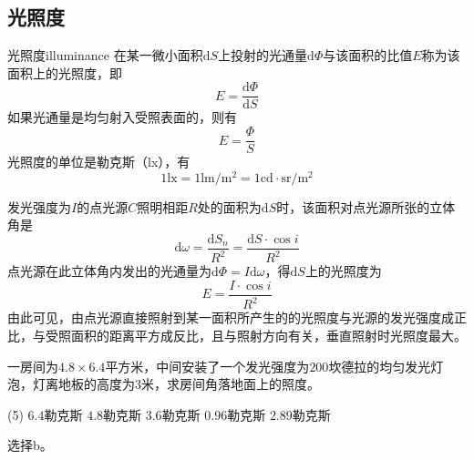 \documentclass[cn,10pt,chinesefont=founder,math=newtx,cite=super,twoside]{elegantbook}
\begin{document}
\subsection{光照度}
\begin{definition}{光照度}{illuminance}
在某一微小面积$\mathrm{d}S$上投射的光通量$\mathrm{d}\varPhi$与该面积的比值$E$称为该面积上的光照度，即
\begin{equation}
E=\frac{\mathrm{d}\varPhi}{\mathrm{d}S}
\end{equation}
如果光通量是均匀射入受照表面的，则有
\begin{equation}
E=\frac{\varPhi}{S}
\end{equation}
光照度的单位是勒克斯（lx），有
\begin{equation}
1\mathrm{lx}=1\mathrm{lm/m^2}=1\mathrm{cd\cdot sr/m^2}
\end{equation}
\end{definition}
\begin{note}
	发光强度为$I$的点光源$C$照明相距$R$处的面积为$\mathrm{d}S$时，该面积对点光源所张的立体角是
	\begin{equation}
	\mathrm{d}\omega=\frac{\mathrm{d}S_n}{R^2}=\frac{\mathrm{d}S\cdot\cos i}{R^2}
	\end{equation}
	点光源在此立体角内发出的光通量为$\mathrm{d}\varPhi=I\mathrm{d}\omega$，得$\mathrm{d}S$上的光照度为
	\begin{equation}
	E=\frac{I\cdot\cos i}{R^2}
	\end{equation}
	由此可见，由点光源直接照射到某一面积所产生的的光照度与光源的发光强度成正比，与受照面积的距离平方成反比，且与照射方向有关，垂直照射时光照度最大。
\end{note}

\begin{problem}
	一房间为$4.8\times6.4$平方米，中间安装了一个发光强度为$200$坎德拉的均匀发光灯泡，灯离地板的高度为$3$米，求房间角落地面上的照度。  
	\begin{tasks}(5)
		\task $6.4$勒克斯
		\task $4.8$勒克斯
		\task $3.6$勒克斯
		\task $0.96$勒克斯
		\task $2.89$勒克斯
	\end{tasks}
\end{problem}
\begin{solution}
	选择b。
\end{solution}
\end{document}
